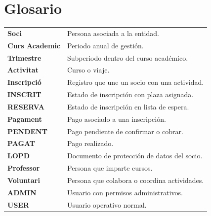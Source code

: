 \documentclass[12pt]{article}
\begin{document}
\section{Glosario}
\begin{longtable}{>{\bfseries}p{}p{}}
Soci & Persona asociada a la entidad.\\
Curs Academic & Periodo anual de gestión.\\
Trimestre & Subperiodo dentro del curso académico.\\
Activitat & Curso o viaje.\\
Inscripció & Registro que une un socio con una actividad.\\
INSCRIT & Estado de inscripción con plaza asignada.\\
RESERVA & Estado de inscripción en lista de espera.\\
Pagament & Pago asociado a una inscripción.\\
PENDENT & Pago pendiente de confirmar o cobrar.\\
PAGAT & Pago realizado.\\
LOPD & Documento de protección de datos del socio.\\
Professor & Persona que imparte cursos.\\
Voluntari & Persona que colabora o coordina actividades.\\
ADMIN & Usuario con permisos administrativos.\\
USER & Usuario operativo normal.\\
\end{longtable}
\end{document}
